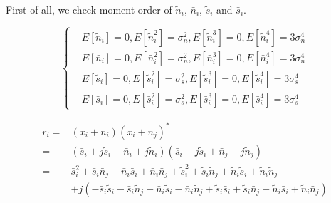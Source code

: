 First of all, we check moment order of $\tilde{n}_i$, $\bar{n}_i$, $\tilde{s}_i$ and $\bar{s}_i$.

\begin{equation}
  \begin{cases}
    &E[\tilde{n}_i] = 0, E[\tilde{n}_i^2] = \sigma_{n}^2, E[\tilde{n}_i^3] = 0, E[\tilde{n}_i^4]= 3\sigma_n^4\\
    &E[\bar{n}_i] = 0,   E[\bar{n}_i^2] = \sigma_n^2, E[\bar{n}_i^3] = 0, E[\bar{n}_i^4]=3\sigma_n^4\\
    &E[\tilde{s}_i] = 0, E[\tilde{s}_i^2] = \sigma_{s}^2, E[\tilde{s}_i^3] = 0, E[\tilde{s}_i^4] = 3\sigma_s^4\\
    &E[\bar{s}_i] = 0, E[\bar{s}_i^2] = \sigma_s^2, E[\bar{s}_i^3] = 0, E[\bar{s}_i^4] = 3\sigma_s^4
  \end{cases}
  \label{equ:momentfun}
\end{equation}

\begin{equation}
  \begin{split}
    r_i = &(x_i+n_i)(x_i + n_j)^\ast\\
    = &(\bar{s}_i+j\tilde{s}_i + \bar{n}_i+j\tilde{n}_i)(\bar{s}_i-j\tilde{s}_i + \bar{n}_j-j\tilde{n}_j)\\
    = &\bar{s}_i^2 + \bar{s}_i\bar{n}_j+\bar{n}_i\bar{s}_i+\bar{n}_i\bar{n}_j + \tilde{s}_i^2 + \tilde{s}_i\tilde{n}_j + \tilde{n}_i\tilde{s}_i + \tilde{n}_i\tilde{n}_j\\
    &+ j( -\bar{s}_i\tilde{s}_i - \bar{s}_i\tilde{n}_j - \bar{n}_i\tilde{s}_i - \bar{n}_i\tilde{n}_j + \tilde{s}_i\bar{s}_i + \tilde{s}_i\bar{n}_j + \tilde{n}_i\bar{s}_i + \tilde{n}_i\bar{n}_j)
  \end{split}
\end{equation}

